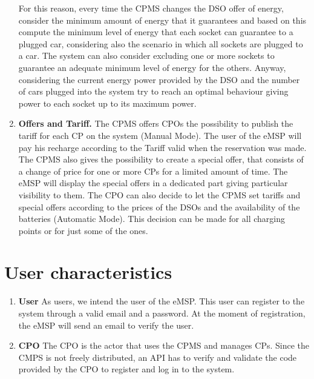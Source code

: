 \documentclass{Configuration_Files/PoliMi3i_thesis}
\begin{document}
\begin{enumerate}
    For this reason, every time the CPMS changes the DSO offer of energy, consider the minimum amount of energy that it guarantees and based on this compute the minimum level of energy that each socket can guarantee to a plugged car, considering also the scenario in which all sockets are plugged to a car. The system can also consider excluding one or more sockets to guarantee an adequate minimum level of energy for the others. 
    Anyway, considering the current energy power provided by the DSO and the number of cars plugged  into the system try to reach an optimal behaviour giving power to each socket up to its maximum power.
    \newline
   
    \item \textbf{Offers and Tariff.} \newline
    The CPMS offers CPOs the possibility to publish the tariff for each CP on the system (Manual Mode). The user of the eMSP will pay his recharge according to the Tariff valid when the reservation was made. The CPMS also gives the possibility to create a special offer, that consists of a change of price for one or more CPs for a limited amount of time. The eMSP will display the special offers in a dedicated part giving particular visibility to them. The CPO can also decide to let the CPMS set tariffs and special offers according to the prices of the DSOs and the availability of the batteries (Automatic Mode). This decision can be made for all charging points or for just some of the ones.\\
\end{enumerate}

\section{User characteristics}

\begin{enumerate}
    \item \textbf{User} \newline
    As users, we intend the user of the eMSP. This user can register to the system through a valid email and a password. At the moment of registration, the eMSP will send an email to verify the user.

    \item \textbf{CPO} \newline
    The CPO is the actor that uses the CPMS and manages CPs. Since the CMPS is not freely distributed, an API has to verify and validate the code provided by the CPO to register and log in to the system.
\end{enumerate}
\end{document}
